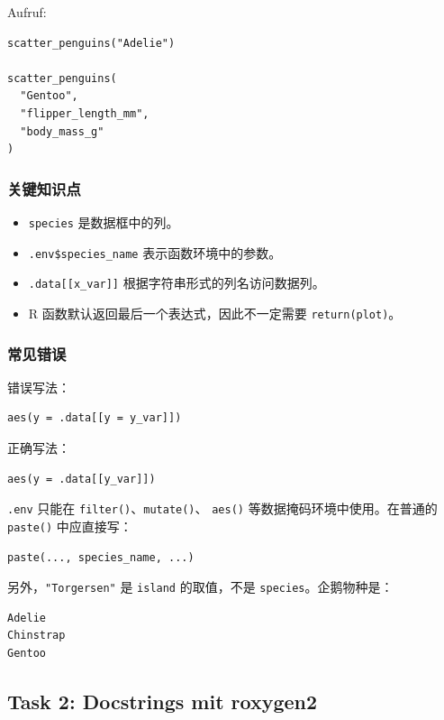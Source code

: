 \documentclass[11pt,a4paper]{ctexart}
\begin{document}
Aufruf:

\begin{lstlisting}
scatter_penguins("Adelie")

scatter_penguins(
  "Gentoo",
  "flipper_length_mm",
  "body_mass_g"
)
\end{lstlisting}

\subsubsection*{关键知识点}

\begin{itemize}
  \item \texttt{species} 是数据框中的列。
  \item \texttt{.env\$species\_name} 表示函数环境中的参数。
  \item \texttt{.data[[x\_var]]} 根据字符串形式的列名访问数据列。
  \item R 函数默认返回最后一个表达式，因此不一定需要
  \texttt{return(plot)}。
\end{itemize}

\subsubsection*{常见错误}

错误写法：

\begin{lstlisting}
aes(y = .data[[y = y_var]])
\end{lstlisting}

正确写法：

\begin{lstlisting}
aes(y = .data[[y_var]])
\end{lstlisting}

\texttt{.env} 只能在 \texttt{filter()}、\texttt{mutate()}、
\texttt{aes()} 等数据掩码环境中使用。在普通的 \texttt{paste()} 中应直接写：

\begin{lstlisting}
paste(..., species_name, ...)
\end{lstlisting}

另外，\texttt{"Torgersen"} 是 \texttt{island} 的取值，不是
\texttt{species}。企鹅物种是：

\begin{lstlisting}
Adelie
Chinstrap
Gentoo
\end{lstlisting}

\subsection{Task 2: Docstrings mit roxygen2}
\end{document}
